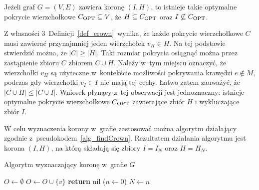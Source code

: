 \begin{theorem}
  Jeżeli graf $G=(V,E)$ zawiera koronę $(I,H)$, to istnieje takie optymalne pokrycie wierzchołkowe $C_{\textnormal{OPT}} \subseteq V$, że $H \subseteq C_{\textnormal{OPT}}$ oraz $I \not\subseteq C_{\textnormal{OPT}}$.
\end{theorem}
\begin{bproof}
  Z własności 3\ Definicji~\ref{def_crown}\ wynika, że każde pokrycie wierzchołkowe $C$ musi zawierać przynajmniej jeden wierzchołek $v_H \in H$.
  Na tej podstawie stwierdzić można, że $|C|\geq|H|$.
  Taki rozmiar pokrycia osiągnąć można przez zastąpienie zbioru $C$ zbiorem $C\cup H$.
  Należy w~tym miejscu oznaczyć, że wierzchołki $v_H$ są użyteczne w~kontekście możliwości pokrywania krawędzi $e \notin M$, podczas gdy wierzchołki $v_I \in
  I$ nie mają tej cechy.
  Łatwo zatem zauważyć, że $|C \cup H| \leq |C \cup I|$.
  Wniosek płynący z~tej obserwacji jest jednoznaczny: istnieje optymalne pokrycie wierzchołkowe $C_{\textnormal{OPT}}$ zawierające zbiór $H$ i wykluczające zbiór $I$.
\end{bproof}
W celu wyznaczenia korony w~grafie zastosować można algorytm działający zgodnie z~pseudokodem~\ref{alg_findCrown}.
Rezultatem działania algorytmu jest korona $(I,H)$, na którą składają się zbiory $I=I_N$ oraz $H=H_N$.
\begin{algorithm}
  \caption{Algorytm wyznaczający koronę w~grafie $G$}\label{alg_findCrown}
  \begin{algorithmic}[1]



    \State $O \gets \emptyset$
        \State $O \gets O \cup \{v\}$
      \EndIf
    \EndFor
     
      \State\textbf{return} nil
    \EndIf
   
  \EndIf
  \State($n \gets 0$)
  \label{findCrown_while}
    \label{findCrown_makeH}
    \label{findCrown_makeI}
  \EndWhile\label{findCrown_endWhile}
  \State $N \gets n$
  \EndFunction
\end{algorithmic}
\end{algorithm}
